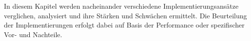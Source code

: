 In diesem Kapitel werden nacheinander verschiedene Implementierungsansätze verglichen, analysiert und ihre Stärken und Schwächen ermittelt. Die Beurteilung der Implementierungen erfolgt dabei auf Basis der Performance oder spezifischer Vor- und Nachteile.
